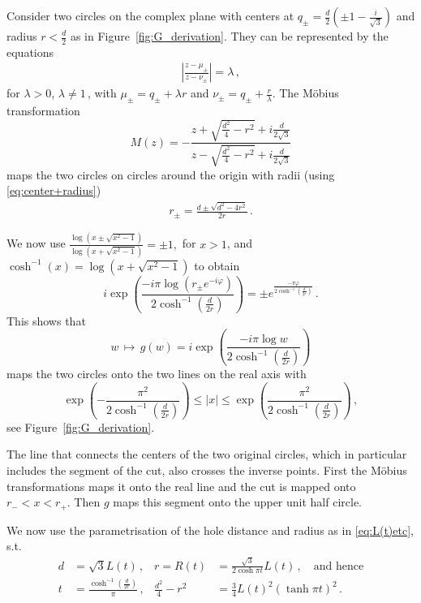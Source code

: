 \documentclass[11pt,a4paper]{article}
\numberwithin{equation}{section}
\begin{document}
Consider two circles on the complex plane with centers at $q_{\pm} = \frac{d}{2} (\pm 1 - \frac{i}{\sqrt{3}})$ and radius $r<\frac{d}{2}$ as in Figure~\ref{fig:G_derivation}.
They can be represented by the equations
%
\begin{align}
    \left|\frac{z-\mu_\pm}{z-\nu_\pm}\right| = \lambda\,,
\end{align}
%
for $\lambda>0$, $\lambda\neq1$\,, with $\mu_\pm = q_{\pm}+\lambda r$ and $\nu_\pm =q_{\pm}+\frac{r}{\lambda}$. The M\"obius transformation 
%
\begin{equation}\label{eq:Moebius2}
    M(z) = -\frac{z + \sqrt{\frac{d^2}{4} - r^2} + i \frac{d}{2\sqrt{3}}}{z - \sqrt{\frac{d^2}{4} - r^2} + i \frac{d}{2\sqrt{3}}}
\end{equation}
%
maps the two circles on circles around the origin with radii (using \eqref{eq:center+radius})
%
\begin{align}
    r_\pm = \frac{d\pm\sqrt{d^2-4r^2}}{2r}\,.
\end{align}

\noindent
We now use $\frac{\log\left(x\pm\sqrt{x^2-1}\right)}{\log\left(x+\sqrt{x^2-1}\right)}=\pm1,$ for $x>1$, and  $\cosh^{-1}(x) = \log\left(x+\sqrt{x^2-1}\right)$ to obtain
%
\begin{equation}
    i \exp\!\left(\frac{-i\pi \log(r_\pm e^{-i \varphi}) }{2\cosh^{-1}\left(\frac{d}{2r}\right)} \right)
    =  \pm e^{\frac{-\pi \varphi}{2\cosh^{-1}\left(\frac{d}{2r}\right)}}\,.
\end{equation}
% 
This shows that 
%
\begin{equation}
w \,\longmapsto\, g(w)  = 
    i \exp\!\left(\frac{-i\pi \log w}{2\cosh^{-1}\left(\frac{d}{2r}\right)} \right)
\end{equation}
%
maps the two circles onto the two lines on the real axis with 
%
\begin{equation}
\exp\left(-\frac{\pi^2}{2\cosh^{-1}\left(\frac{d}{2r}\right)}\right) \le |x| \le  \exp\left(\frac{\pi^2}{2\cosh^{-1}\left(\frac{d}{2r}\right)}\right)
\,,
\end{equation}
%
see Figure~\ref{fig:G_derivation}. 

The line that connects the centers of the two original circles, which in particular includes the segment of the cut, also crosses the inverse points. First the M\"obius transformations maps it onto the real line and the cut is mapped onto $r_- < x < r_+$. Then $g$ maps this segment onto the upper unit half circle. 

We now use the parametrisation of the hole distance and radius as in \eqref{eq:L(t)etc}, s.t. 
%
\begin{align}
    d&=\sqrt{3}L(t)
    \,,& r = R(t) &= \frac{\sqrt{3}}{2 \cosh{\pi t}}L(t)\,, \quad \text{and hence} 
    \nonumber \\
    t &= \frac{\cosh^{-1}\!\left(\frac{d}{2r}\right)}{\pi}\,, & \frac{d^2}{4} - r^2 &= \frac{3}{4} L(t)^2 \left(\tanh{\pi t}\right)^2\,.
\end{align}
\end{document}
